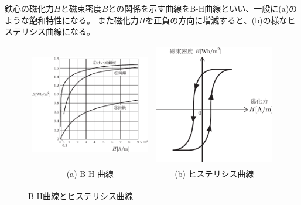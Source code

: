 \documentclass[11pt,dvipdfmx]{jarticle}
\begin{document}
鉄心の磁化力$H$と磁束密度$B$との関係を示す曲線をB-H曲線といい、一般に(a)のような飽和特性になる。
また磁化力$H$を正負の方向に増減すると、(b)の様なヒステリシス曲線になる。
\begin{figure}[htbp]
	\centering
	\begin{tabular}{cc}
		\includegraphics[width=70mm]{fig/bhcurve.pdf} &
		\includegraphics[width=70mm]{fig/hysteresis.pdf} \\
		(a) B-H 曲線 & (b) ヒステリシス曲線
	\end{tabular}
	\caption{B-H曲線とヒステリシス曲線}
	\label{fig:hys:bhcurve}
\end{figure}
\end{document}

